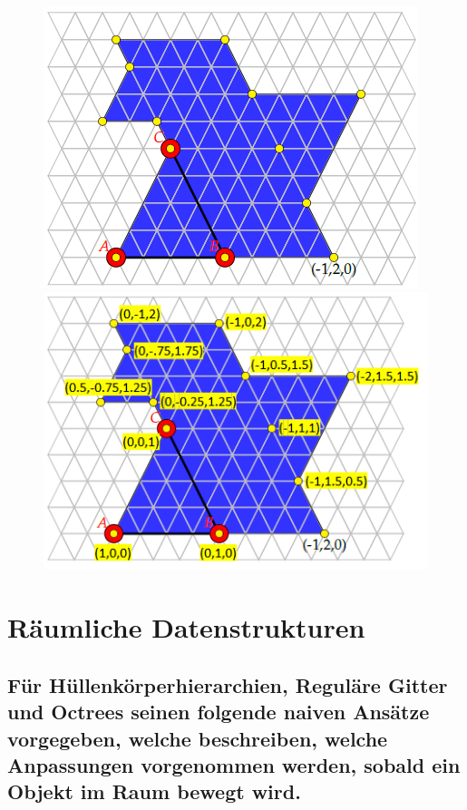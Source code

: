 \documentclass[a4paper,10pt,DIV=14]{scrartcl}
\begin{document}
\begin{figure}[!htbp]
	\begin{minipage}[c]{0.49\textwidth}
		\centering						
		\includegraphics[width=0.95\linewidth]{map}
	\end{minipage}
	\hfill
	\begin{minipage}[c]{0.49\textwidth}
		\centering						
		\includegraphics[width=0.95\linewidth]{map2}
	\end{minipage}
\end{figure}


\section{Räumliche Datenstrukturen}

\subsection{Für Hüllenkörperhierarchien, Reguläre Gitter und Octrees seinen folgende naiven Ansätze vorgegeben, welche beschreiben, welche Anpassungen vorgenommen werden, sobald ein Objekt im Raum bewegt wird.}
\end{document}
